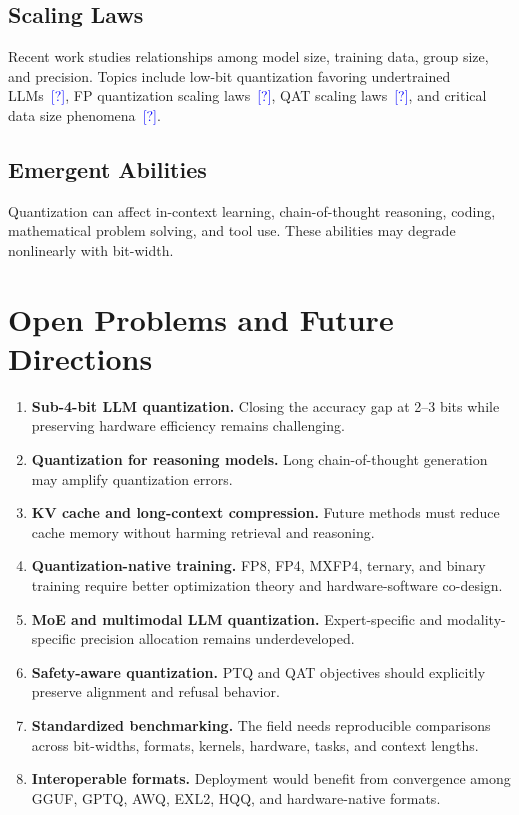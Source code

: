 \documentclass[journal,10pt]{IEEEtran}
\newcommand{\CITE}{\textcolor{blue}{[?]}}
\begin{document}
\subsection{Scaling Laws}
Recent work studies relationships among model size, training data, group size, and precision. Topics include low-bit quantization favoring undertrained LLMs~\CITE, FP quantization scaling laws~\CITE, QAT scaling laws~\CITE, and critical data size phenomena~\CITE.

\subsection{Emergent Abilities}
Quantization can affect in-context learning, chain-of-thought reasoning, coding, mathematical problem solving, and tool use. These abilities may degrade nonlinearly with bit-width.

\section{Open Problems and Future Directions}

\begin{enumerate}[leftmargin=*,label=\textbf{\arabic*.}]
  \item \textbf{Sub-4-bit LLM quantization.} Closing the accuracy gap at 2--3 bits while preserving hardware efficiency remains challenging.
  \item \textbf{Quantization for reasoning models.} Long chain-of-thought generation may amplify quantization errors.
  \item \textbf{KV cache and long-context compression.} Future methods must reduce cache memory without harming retrieval and reasoning.
  \item \textbf{Quantization-native training.} FP8, FP4, MXFP4, ternary, and binary training require better optimization theory and hardware-software co-design.
  \item \textbf{MoE and multimodal LLM quantization.} Expert-specific and modality-specific precision allocation remains underdeveloped.
  \item \textbf{Safety-aware quantization.} PTQ and QAT objectives should explicitly preserve alignment and refusal behavior.
  \item \textbf{Standardized benchmarking.} The field needs reproducible comparisons across bit-widths, formats, kernels, hardware, tasks, and context lengths.
  \item \textbf{Interoperable formats.} Deployment would benefit from convergence among GGUF, GPTQ, AWQ, EXL2, HQQ, and hardware-native formats.
\end{enumerate}
\end{document}
